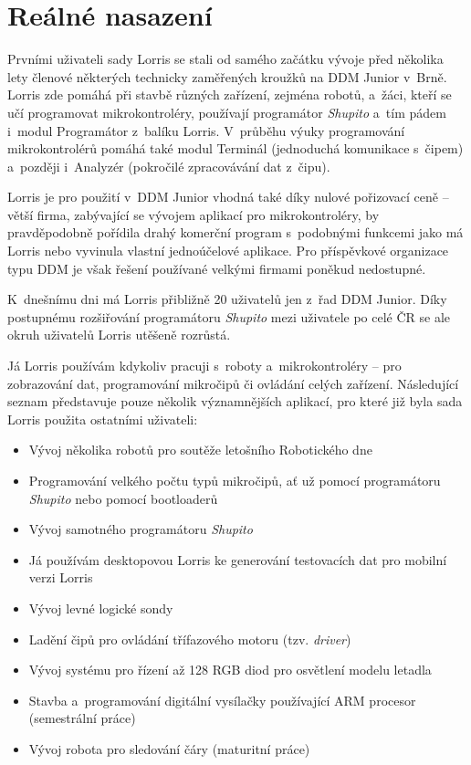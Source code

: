 \documentclass[12pt, a4paper, oneside]{article}
\newcommand{\It}{\textit}  %
\begin{document}
\newpage
\section{Reálné nasazení}
\label{usage}
Prvními uživateli sady Lorris se stali od samého začátku vývoje před několika lety členové některých technicky zaměřených kroužků na DDM Junior\cite{junior} v~Brně. Lorris zde pomáhá při stavbě různých zařízení, zejména robotů, a~žáci, kteří se učí programovat mikrokontroléry, používají programátor \It{Shupito} a~tím pádem i~modul Programátor z~balíku Lorris. V~průběhu výuky programování mikrokontrolérů pomáhá také modul Terminál (jednoduchá komunikace s~čipem) a~později i~Analyzér (pokročilé zpracovávání dat z~čipu).

Lorris je pro použití v~DDM Junior vhodná také díky nulové pořizovací ceně -- větší firma, zabývající se vývojem aplikací pro mikrokontroléry, by pravděpodobně pořídila drahý komerční program s~podobnými funkcemi jako má Lorris nebo vyvinula vlastní jednoúčelové aplikace. Pro příspěvkové organizace typu DDM je však řešení používané velkými firmami poněkud nedostupné.

K~dnešnímu dni má Lorris přibližně 20 uživatelů jen z~řad DDM Junior. Díky postupnému rozšiřování programátoru \It{Shupito} mezi uživatele po celé ČR se ale okruh uživatelů Lorris utěšeně rozrůstá.

\vspace{10mm}

\noindent Já Lorris používám kdykoliv pracuji s~roboty a~mikrokontroléry -- pro zobrazování dat, programování mikročipů či ovládání celých zařízení. Následující seznam představuje pouze několik významnějších aplikací, pro které již byla sada Lorris použita ostatními uživateli:
\begin{itemize}
    \item Vývoj několika robotů pro soutěže letošního Robotického dne\cite{rob_den_new}
    \item Programování velkého počtu typů mikročipů, ať už pomocí programátoru \It{Shupito} nebo pomocí bootloaderů
    \item Vývoj samotného programátoru \It{Shupito}
    \item Já používám desktopovou Lorris ke generování testovacích dat pro mobilní verzi Lorris
    \item Vývoj levné logické sondy
    \item Ladění čipů pro ovládání třífazového motoru (tzv. \It{driver})
    \item Vývoj systému pro řízení až 128 RGB diod pro osvětlení modelu letadla
    \item Stavba a~programování digitální vysílačky používající ARM procesor (semestrální práce)
    \item Vývoj robota pro sledování čáry (maturitní práce)
\end{itemize}
\end{document}
